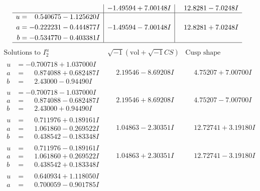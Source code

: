 \documentclass[1p]{elsarticle_modified}
\theoremstyle{definition}
\newcommand{\I}{\sqrt{-1}}
\begin{document}
$$\begin{array}{c|c|c}
 & -1.49594 + 7.00148 I & \phantom{-}12.8281 - 7.0248 I \\ \hline\begin{aligned}
u &= \phantom{-}0.540675 - 1.125620 I \\
a &= -0.222231 - 0.444877 I \\
b &= -0.534770 - 0.403381 I\end{aligned}
 & -1.49594 - 7.00148 I & \phantom{-}12.8281 + 7.0248 I\\
 \hline 
 \end{array}$$\newpage$$\begin{array}{c|c|c}  
\text{Solutions to }I^u_{2}& \I (\text{vol} + \sqrt{-1}CS) & \text{Cusp shape}\\
 \hline 
\begin{aligned}
u &= -0.700718 + 1.037000 I \\
a &= \phantom{-}0.874088 + 0.682487 I \\
b &= \phantom{-}2.43000 - 0.94490 I\end{aligned}
 & \phantom{-}2.19546 - 8.69208 I & \phantom{-}4.75207 + 7.00700 I \\ \hline\begin{aligned}
u &= -0.700718 - 1.037000 I \\
a &= \phantom{-}0.874088 - 0.682487 I \\
b &= \phantom{-}2.43000 + 0.94490 I\end{aligned}
 & \phantom{-}2.19546 + 8.69208 I & \phantom{-}4.75207 - 7.00700 I \\ \hline\begin{aligned}
u &= \phantom{-}0.711976 + 0.189161 I \\
a &= \phantom{-}1.061860 - 0.269522 I \\
b &= \phantom{-}0.438542 - 0.183348 I\end{aligned}
 & \phantom{-}1.04863 - 2.30351 I & \phantom{-}12.72741 + 3.19180 I \\ \hline\begin{aligned}
u &= \phantom{-}0.711976 - 0.189161 I \\
a &= \phantom{-}1.061860 + 0.269522 I \\
b &= \phantom{-}0.438542 + 0.183348 I\end{aligned}
 & \phantom{-}1.04863 + 2.30351 I & \phantom{-}12.72741 - 3.19180 I \\ \hline\begin{aligned}
u &= \phantom{-}0.640934 + 1.118050 I \\
a &= \phantom{-}0.700059 - 0.901785 I \\

\end{aligned}
\end{array}$$
\end{document}
